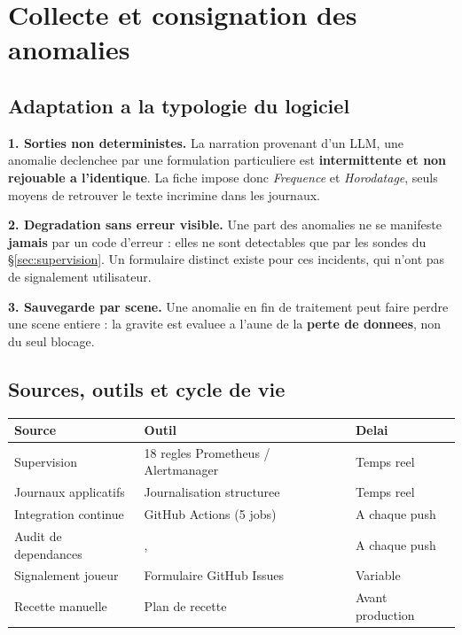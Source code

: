 \section{Collecte et consignation des anomalies}
\label{sec:collecte}


\subsection{Adaptation a la typologie du logiciel}

\textbf{1. Sorties non deterministes.} La narration provenant d'un LLM, une anomalie declenchee par
une formulation particuliere est \textbf{intermittente et non rejouable a l'identique}. La fiche
impose donc \emph{Frequence} et \emph{Horodatage}, seuls moyens de retrouver le texte incrimine
dans les journaux.

\textbf{2. Degradation sans erreur visible.} Une part des anomalies ne se manifeste \textbf{jamais}
par un code d'erreur : elles ne sont detectables que par les sondes du \S\ref{sec:supervision}.
Un formulaire distinct existe pour ces incidents, qui n'ont pas de signalement utilisateur.

\textbf{3. Sauvegarde par scene.} Une anomalie en fin de traitement peut faire perdre une scene
entiere : la gravite est evaluee a l'aune de la \textbf{perte de donnees}, non du seul blocage.

\subsection{Sources, outils et cycle de vie}

\footnotesize
\begin{tabularx}{\linewidth}{@{}L{3.2cm} X L{2.6cm}@{}}
\toprule
\textbf{Source} & \textbf{Outil} & \textbf{Delai} \\
\midrule
Supervision & 18 regles Prometheus / Alertmanager & Temps reel \\
Journaux applicatifs & Journalisation structuree & Temps reel \\
Integration continue & GitHub Actions (5 jobs) & A chaque push \\
Audit de dependances & ,  & A chaque push \\
Signalement joueur & Formulaire GitHub Issues & Variable \\
Recette manuelle & Plan de recette & Avant production \\
\bottomrule
\end{tabularx}
\normalsize

